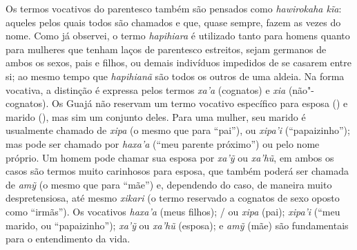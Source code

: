 Os termos vocativos do parentesco também são pensados como
\emph{hawirokaha kĩa}: aqueles pelos quais todos são chamados e que,
quase sempre, fazem as vezes do nome. Como já observei, o termo
\emph{hapihiara} é utilizado tanto para homens quanto para mulheres que
tenham laços de parentesco estreitos, sejam germanos de ambos os sexos,
pais e filhos, ou demais indivíduos impedidos de se casarem entre si; ao
mesmo tempo que \emph{hapihianã} são todos os outros de uma aldeia. Na
forma vocativa, a distinção é expressa pelos termos \emph{xa'a}
(cognatos) e \emph{xia} (não"-cognatos). Os Guajá não reservam um termo
vocativo específico para esposa () e marido (), mas sim um conjunto
deles. Para uma mulher, seu marido é usualmente chamado de \emph{xipa}
(o mesmo que para ``pai''), ou \emph{xipa'i} (``papaizinho''); mas pode
ser chamado por \emph{haxa'a} (``meu parente próximo'') ou pelo nome
próprio. Um homem pode chamar sua esposa por \emph{xa'ỹ} ou
\emph{xa'hũ}, em ambos os casos são termos muito carinhosos para esposa,
que também poderá ser chamada de \emph{amỹ} (o mesmo que para ``mãe'') e,
dependendo do caso, de maneira muito despretensiosa, até mesmo
\emph{xikari} (o termo reservado a cognatos de sexo oposto como
``irmãs''). Os vocativos \emph{haxa'a} (meus filhos); / ou \emph{xipa}
(pai); \emph{xipa'i} (``meu marido, ou ``papaizinho''); \emph{xa'ỹ} ou
\emph{xa'hũ} (esposa); e \emph{amỹ} (mãe) são fundamentais para o
entendimento da vida.

